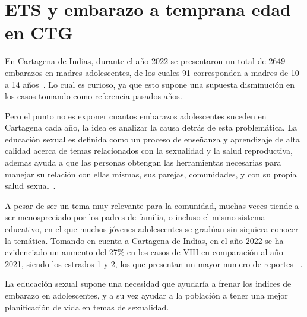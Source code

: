 \documentclass[letterpaper, 12pt]{report}
\begin{document}
\chapter*{ETS y embarazo a temprana edad en CTG}

% 
% 
% 

En Cartagena de Indias, durante el año 2022 se presentaron un total de 2649
embarazos en madres adolescentes, de los cuales 91 corresponden a madres de 10
a 14 años~\cite{CifrasCartagena}. Lo cual es curioso, ya que esto supone una
supuesta disminución en los casos tomando como referencia pasados años.

\bigskip

Pero el punto no es exponer cuantos embarazos adolescentes suceden en Cartagena
cada año, la idea es analizar la causa detrás de esta problemática. La educación
sexual es definida como un proceso de enseñanza y aprendizaje de alta calidad
acerca de temas relacionados con la sexualidad y la salud reproductiva, ademas
ayuda a que las personas obtengan las herramientas necesarias para manejar su
relación con ellas mismas, sus parejas, comunidades, y con su propia salud
sexual~\cite{EducacionSexualDefinicion}.

\bigskip

A pesar de ser un tema muy relevante para la comunidad, muchas veces tiende a ser
menospreciado por los padres de familia, o incluso el mismo sistema educativo,
en el que muchos jóvenes adolescentes se gradúan sin siquiera conocer la
temática. Tomando en cuenta a Cartagena de Indias, en el año 2022 se ha
evidenciado un aumento del 27\% en los casos de VIH en comparación al año
2021, siendo los estrados 1 y 2, los que presentan un mayor numero de reportes
~\cite{CasosVIH}. %

\bigskip

La educación sexual supone una necesidad que ayudaría a frenar los indices de
embarazo en adolescentes, y a su vez ayudar a la población a tener una mejor
planificación de vida en temas de sexualidad.

\newpage


\end{document}
